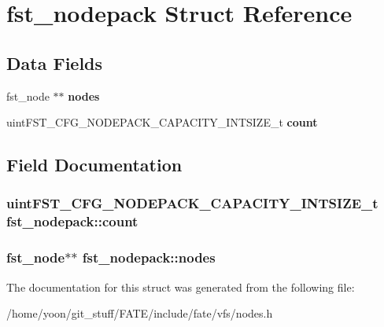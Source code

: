 \hypertarget{structfst__nodepack}{\section{fst\-\_\-nodepack Struct Reference}
\label{structfst__nodepack}
}
\subsection*{Data Fields}
\begin{DoxyCompactItemize}
\item 
\hypertarget{structfst__nodepack_a42dacfb317b681c93f0c0efe14b7bd21}{fst\-\_\-node $\ast$$\ast$ {\bfseries nodes}}\label{structfst__nodepack_a42dacfb317b681c93f0c0efe14b7bd21}

\item 
\hypertarget{structfst__nodepack_aa66623cb81edaba7e55a5ffec055004f}{uint\-F\-S\-T\-\_\-\-C\-F\-G\-\_\-\-N\-O\-D\-E\-P\-A\-C\-K\-\_\-\-C\-A\-P\-A\-C\-I\-T\-Y\-\_\-\-I\-N\-T\-S\-I\-Z\-E\-\_\-t {\bfseries count}}\label{structfst__nodepack_aa66623cb81edaba7e55a5ffec055004f}

\end{DoxyCompactItemize}


\subsection{Field Documentation}
\hypertarget{structfst__nodepack_aa66623cb81edaba7e55a5ffec055004f}{
\subsubsection[{count}]{\setlength{\rightskip}{0pt plus 5cm}uint\-F\-S\-T\-\_\-\-C\-F\-G\-\_\-\-N\-O\-D\-E\-P\-A\-C\-K\-\_\-\-C\-A\-P\-A\-C\-I\-T\-Y\-\_\-\-I\-N\-T\-S\-I\-Z\-E\-\_\-t fst\-\_\-nodepack\-::count}}\label{structfst__nodepack_aa66623cb81edaba7e55a5ffec055004f}
\hypertarget{structfst__nodepack_a42dacfb317b681c93f0c0efe14b7bd21}{
\subsubsection[{nodes}]{\setlength{\rightskip}{0pt plus 5cm}fst\-\_\-node$\ast$$\ast$ fst\-\_\-nodepack\-::nodes}}\label{structfst__nodepack_a42dacfb317b681c93f0c0efe14b7bd21}


The documentation for this struct was generated from the following file\-:\begin{DoxyCompactItemize}
\item 
/home/yoon/git\-\_\-stuff/\-F\-A\-T\-E/include/fate/vfs/nodes.\-h\end{DoxyCompactItemize}
